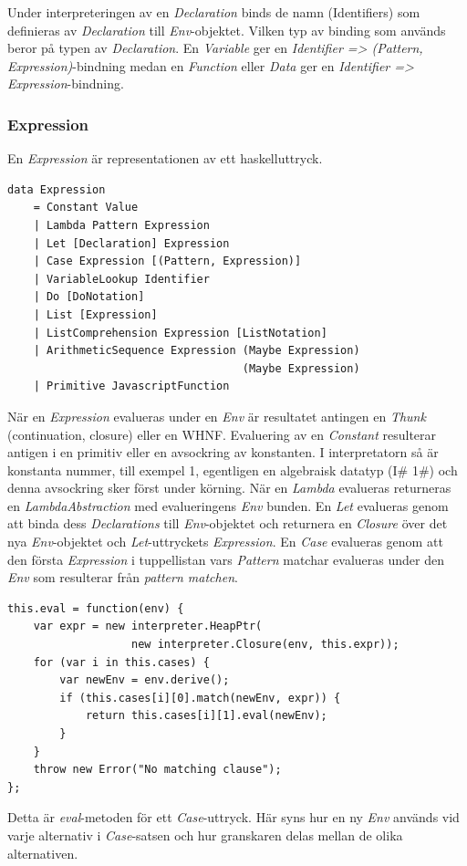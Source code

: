 Under interpreteringen av en \emph{Declaration} binds de namn (Identifiers) som definieras av \emph{Declaration} till \emph{Env}-objektet. Vilken typ av binding som används beror på typen av \emph{Declaration}. En \emph{Variable} ger en \emph{Identifier => (Pattern, Expression)}-bindning medan en \emph{Function} eller \emph{Data} ger en \emph{Identifier => Expression}-bindning.

\subsubsection{Expression}
En \emph{Expression} är representationen av ett haskelluttryck.

\begin{lstlisting}
data Expression 
    = Constant Value
    | Lambda Pattern Expression
    | Let [Declaration] Expression
    | Case Expression [(Pattern, Expression)]
    | VariableLookup Identifier
    | Do [DoNotation]
    | List [Expression]
    | ListComprehension Expression [ListNotation]
    | ArithmeticSequence Expression (Maybe Expression) 
                                    (Maybe Expression)
    | Primitive JavascriptFunction
\end{lstlisting}

När en \emph{Expression} evalueras under en \emph{Env} är resultatet antingen en \emph{Thunk} (continuation, closure) eller en WHNF. Evaluering av en \emph{Constant} resulterar antigen i en primitiv eller en avsockring av konstanten. I interpretatorn så är konstanta nummer, till exempel 1, egentligen en algebraisk datatyp (I\# 1\#) och denna avsockring sker först under körning. När en \emph{Lambda} evalueras returneras en \emph{LambdaAbstraction} med evalueringens \emph{Env} bunden. En \emph{Let} evalueras genom att binda dess \emph{Declarations} till \emph{Env}-objektet och returnera en \emph{Closure} över det nya \emph{Env}-objektet och \emph{Let}-uttryckets \emph{Expression}. En \emph{Case} evalueras genom att den första \emph{Expression} i tuppellistan vars \emph{Pattern} matchar evalueras under den \emph{Env} som resulterar från \emph{pattern matchen}.
\begin{lstlisting}
this.eval = function(env) {
    var expr = new interpreter.HeapPtr(
                   new interpreter.Closure(env, this.expr));
    for (var i in this.cases) {
        var newEnv = env.derive();
        if (this.cases[i][0].match(newEnv, expr)) {
            return this.cases[i][1].eval(newEnv);
        }
    }
    throw new Error("No matching clause");
};
\end{lstlisting}
Detta är \emph{eval}-metoden för ett \emph{Case}-uttryck. Här syns hur en ny \emph{Env} används vid varje alternativ i \emph{Case}-satsen och hur granskaren delas mellan de olika alternativen.


